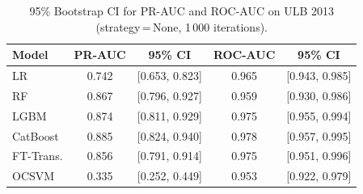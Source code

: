 \begin{table}[ht!]
\centering
\caption{95\% Bootstrap CI for PR-AUC and ROC-AUC on ULB 2013 (strategy\,=\,None, 1\,000 iterations).}
\label{tab:ci_ulb}
\begin{tabular}{l c c c c}
\toprule
Model & PR-AUC & 95\% CI & ROC-AUC & 95\% CI \\
\midrule
LR         & 0.742 & [0.653, 0.823] & 0.965 & [0.943, 0.985] \\
RF         & 0.867 & [0.796, 0.927] & 0.959 & [0.930, 0.986] \\
LGBM       & 0.874 & [0.811, 0.929] & 0.975 & [0.955, 0.994] \\
CatBoost   & 0.885 & [0.824, 0.940] & 0.978 & [0.957, 0.995] \\
FT-Trans.  & 0.856 & [0.791, 0.914] & 0.975 & [0.951, 0.996] \\
OCSVM      & 0.335 & [0.252, 0.449] & 0.953 & [0.922, 0.979] \\
\bottomrule
\end{tabular}
\end{table}